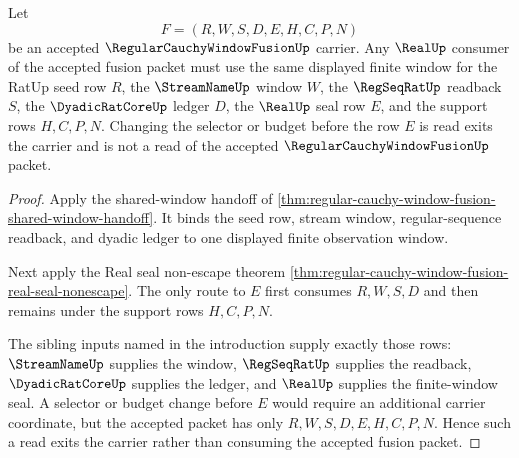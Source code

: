 \begin{theorem}
\label{thm:regular-cauchy-window-fusion-selector-budget-compatibility}
Let
$$
F=(R,W,S,D,E,H,C,P,N)
$$
be an accepted $\RegularCauchyWindowFusionUp$ carrier. Any $\RealUp$ consumer of the accepted fusion packet must use the same displayed finite window for the RatUp seed row $R$, the $\StreamNameUp$ window $W$, the $\RegSeqRatUp$ readback $S$, the $\DyadicRatCoreUp$ ledger $D$, the $\RealUp$ seal row $E$, and the support rows $H,C,P,N$. Changing the selector or budget before the row $E$ is read exits the carrier and is not a read of the accepted $\RegularCauchyWindowFusionUp$ packet.
\end{theorem}
\begin{proof}
Apply the shared-window handoff of \autoref{thm:regular-cauchy-window-fusion-shared-window-handoff}. It binds the seed row, stream window, regular-sequence readback, and dyadic ledger to one displayed finite observation window.

Next apply the Real seal non-escape theorem \autoref{thm:regular-cauchy-window-fusion-real-seal-nonescape}. The only route to $E$ first consumes $R,W,S,D$ and then remains under the support rows $H,C,P,N$.

The sibling inputs named in the introduction supply exactly those rows: $\StreamNameUp$ supplies the window, $\RegSeqRatUp$ supplies the readback, $\DyadicRatCoreUp$ supplies the ledger, and $\RealUp$ supplies the finite-window seal. A selector or budget change before $E$ would require an additional carrier coordinate, but the accepted packet has only $R,W,S,D,E,H,C,P,N$. Hence such a read exits the carrier rather than consuming the accepted fusion packet.
\end{proof}

